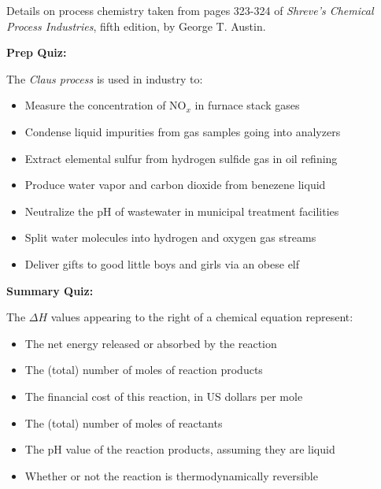 \vskip 10pt

Details on process chemistry taken from pages 323-324 of {\it Shreve's Chemical Process Industries}, fifth edition, by George T. Austin.

\vfil \eject

\noindent
{\bf Prep Quiz:}

The {\it Claus process} is used in industry to:

\begin{itemize}
\item{} Measure the concentration of NO$_{x}$ in furnace stack gases
\vskip 5pt 
\item{} Condense liquid impurities from gas samples going into analyzers
\vskip 5pt 
\item{} Extract elemental sulfur from hydrogen sulfide gas in oil refining
\vskip 5pt 
\item{} Produce water vapor and carbon dioxide from benezene liquid
\vskip 5pt 
\item{} Neutralize the pH of wastewater in municipal treatment facilities
\vskip 5pt 
\item{} Split water molecules into hydrogen and oxygen gas streams
\vskip 5pt 
\item{} Deliver gifts to good little boys and girls via an obese elf
\end{itemize}



\vfil \eject

\noindent
{\bf Summary Quiz:}

The $\Delta H$ values appearing to the right of a chemical equation represent:

\begin{itemize}
\item{} The net energy released or absorbed by the reaction 
\vskip 5pt 
\item{} The (total) number of moles of reaction products
\vskip 5pt 
\item{} The financial cost of this reaction, in US dollars per mole
\vskip 5pt 
\item{} The (total) number of moles of reactants 
\vskip 5pt 
\item{} The pH value of the reaction products, assuming they are liquid
\vskip 5pt 
\item{} Whether or not the reaction is thermodynamically reversible
\end{itemize}




